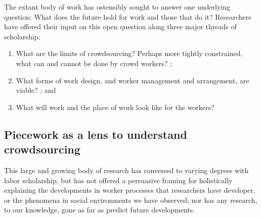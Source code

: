 \documentclass[trackingWork]{subfiles}
\begin{document}
The extant body of work has ostensibly sought to answer one underlying question:
What does the future hold for work and those that do it? %
Researchers have offered their input on this open question along three major threads of scholarship:
\begin{enumerate}
  \item What are the limits of crowdsourcing?
  Perhaps more tightly constrained,
  what can and cannot be done by crowd workers?
    \cite{foundry,suzukiAtelier,KimStoria,yuanAlmost,YuEncouragingOutside,embracingErrorKrishna,Nebeling:2016:WCW:2858036.2858169,Hahn:2016:KAB:2858036.2858364};
  \item What forms of work design, and worker management and arrangement, are viable?
    \cite{bernsteinSoylent,sensitiveTasks,LykourentzouPersonalityMatters,KucherbaevReLauncher,Law:2016:CKC:2858036.2858144,Cai:2016:CRI:2858036.2858237,Chang:2016:ACC:2858036.2858411,Newell:2016:OMA:2858036.2858490}; and%
  \item What will work and the place of work look like for the workers?
    \cite{turkopticon,storiesIraniSilberman,dynamo,crowdcollab,whyWouldAnyoneBrewer,takingAHITMcInnis}
\end{enumerate}








\subsection{Piecework as a lens to understand crowdsourcing}
This large and growing body of research has conversed
to varying degrees with labor scholarship,
but has not offered a persuasive framing for holistically explaining
the developments in worker processes that researchers have developer, or
the phenomena in social environments we have observed;
nor has any research, to our knowledge,
gone as far as predict future developments.
\end{document}
